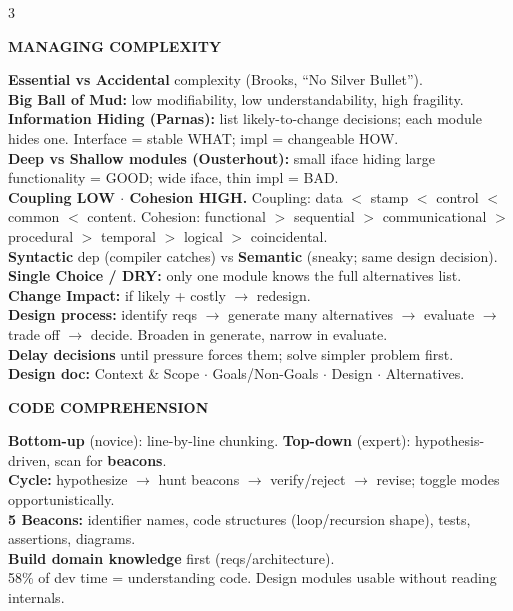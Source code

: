 \documentclass[10pt,letterpaper]{article}
\newenvironment{topic}[1]{%
  \par\addvspace{1.5pt}%
  \noindent\colorbox{hdrBG}{%
    \begin{minipage}{\dimexpr\linewidth-2\fboxsep\relax}%
      \centering\bfseries\sffamily\fontsize{6pt}{7pt}\selectfont\color{hdrFG}\MakeUppercase{#1}%
    \end{minipage}%
  }\par\nobreak\vskip0.5pt%
  \begingroup\setlength{\leftskip}{0pt}\setlength{\rightskip}{0pt}%
}{%
  \endgroup\par\addvspace{0.5pt}%
}
\newcommand{\hd}[1]{\textcolor{accent}{\textbf{#1}}}
\begin{document}
\begin{multicols*}{3}
\begin{topic}{Managing Complexity}
\hd{Essential vs Accidental} complexity (Brooks, ``No Silver Bullet'').\\
\hd{Big Ball of Mud:} low modifiability, low understandability, high fragility.\\
\hd{Information Hiding (Parnas):} list likely-to-change decisions; each module hides one. Interface = stable WHAT; impl = changeable HOW.\\
\hd{Deep vs Shallow modules (Ousterhout):} small iface hiding large functionality = GOOD; wide iface, thin impl = BAD.\\
\hd{Coupling LOW $\cdot$ Cohesion HIGH.} Coupling: data $<$ stamp $<$ control $<$ common $<$ content. Cohesion: functional $>$ sequential $>$ communicational $>$ procedural $>$ temporal $>$ logical $>$ coincidental.\\
\hd{Syntactic} dep (compiler catches) vs \hd{Semantic} (sneaky; same design decision).\\
\hd{Single Choice / DRY:} only one module knows the full alternatives list.\\
\hd{Change Impact:} if likely + costly $\to$ redesign.\\
\hd{Design process:} identify reqs $\to$ generate many alternatives $\to$ evaluate $\to$ trade off $\to$ decide. Broaden in generate, narrow in evaluate.\\
\hd{Delay decisions} until pressure forces them; solve simpler problem first.\\
\hd{Design doc:} Context \& Scope $\cdot$ Goals/Non-Goals $\cdot$ Design $\cdot$ Alternatives.
\end{topic}

\begin{topic}{Code Comprehension}
\hd{Bottom-up} (novice): line-by-line chunking. \hd{Top-down} (expert): hypothesis-driven, scan for \textbf{beacons}.\\
\hd{Cycle:} hypothesize $\to$ hunt beacons $\to$ verify/reject $\to$ revise; toggle modes opportunistically.\\
\hd{5 Beacons:} identifier names, code structures (loop/recursion shape), tests, assertions, diagrams.\\
\hd{Build domain knowledge} first (reqs/architecture).\\
58\% of dev time = understanding code. Design modules usable without reading internals.
\end{topic}


\end{multicols*}
\end{document}
